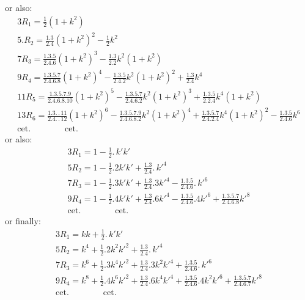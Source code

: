 \documentclass{article}
\begin{document}
or also:
\[
\begin{gathered}
3R_{1}=\frac{1}{2}(1+k^{2})\\[1.5ex]
5.R_{2}=\frac{1.3}{2.4}(1+k^{2})^{2}-\frac{1}{2}k^{2}\\[1.5ex]
7R_{3}=\frac{1.3.5}{2.4.6}(1+k^{2})^{3}-\frac{1.3}{2.2}k^{2}(1+k^{2})\\[1.5ex]
9R_{4}=\frac{1.3.5.7}{2.4.6.8}(1+k^{2})^{4}-\frac{1.3.5}{2.4.2}k^{2}(1+k^{2})^{2}+\frac{1.3}{2.4}k^{4}\\[1.5ex]
11R_{5}=\frac{1.3.5.7.9}{2.4.6.8.10}(1+k^{2})^{5}-\frac{1.3.5.7}{2.4.6.2}k^{2}(1+k^{2})^{3}+\frac{1.3.5}{2.2.4}k^{4}(1+k^{2})\\[1.5ex]
13R_{6}=\frac{1.3.\,.\,11}{2.4.\,.\,12}(1+k^{2})^{6}-\frac{1.3.5.7.9}{2.4.6.8.2}k^{2}(1+k^{2})^{4}+\frac{1.3.5.7}{2.4.2.4}k^{4}(1+k^{2})^{2}-\frac{1.3.5}{2.4.6}k^{6}\\[1.5ex]
\text{cet.}\qquad\qquad\text{cet.}
\end{gathered}
\]
or also:
\[
\begin{gathered}
3R_{1}=1-\frac{1}{2}.\,k'k'\\[1.5ex]
5R_{2}=1-\frac{1}{2}.2k'k'+\frac{1.3}{2.4}.\,k'^{4}\\[1.5ex]
7R_{3}=1-\frac{1}{2}.3k'k'+\frac{1.3}{2.4}.3k'^{4}-\frac{1.3.5}{2.4.6}.\,k'^{6}\\[1.5ex]
9R_{4}=1-\frac{1}{2}.4k'k'+\frac{1.3}{2.4}.6k'^{4}-\frac{1.3.5}{2.4.6}.4k'^{6}+\frac{1.3.5.7}{2.4.6.8}k'^{8}\\[1.5ex]
\text{cet.}\qquad\qquad\text{cet.}
\end{gathered}
\]
or finally:
\[
\begin{gathered}
3R_{1}=kk+\frac{1}{2}.\,k'k'\\[1.5ex]
5R_{2}=k^{4}+\frac{1}{2}.2k^{2}k'^{2}+\frac{1.3}{2.4}.\,k'^{4}\\[1.5ex]
7R_{3}=k^{6}+\frac{1}{2}.3k^{4}k'^{2}+\frac{1.3}{2.4}.3k^{2}k'^{4}+\frac{1.3.5}{2.4.6}.\,k'^{6}\\[1.5ex]
9R_{4}=k^{8}+\frac{1}{2}.4k^{6}k'^{2}+\frac{1.3}{2.4}.6k^{4}k'^{4}+\frac{1.3.5}{2.4.6}.4k^{2}k'^{6}+\frac{1.3.5.7}{2.4.6.7}k'^{8}\\[1.5ex]
\text{cet.}\qquad\qquad\text{cet.}
\end{gathered}
\]
\end{document}
